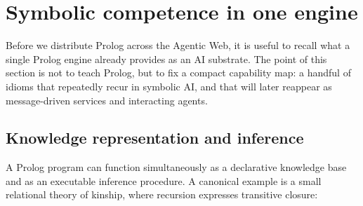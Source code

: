 %
%
%

\section{Symbolic competence in one engine}
\label{sec:symbolic-prolog}

Before we distribute Prolog across the Agentic Web, it is useful to recall what a single Prolog engine already provides as an AI substrate. The point of this section is not to teach Prolog, but to fix a compact capability map: a handful of idioms that repeatedly recur in symbolic AI, and that will later reappear as message-driven services and interacting agents.

\subsection{Knowledge representation and inference}

A Prolog program can function simultaneously as a declarative knowledge base and as an executable inference procedure. A canonical example is a small relational theory of kinship, where recursion expresses transitive closure:

